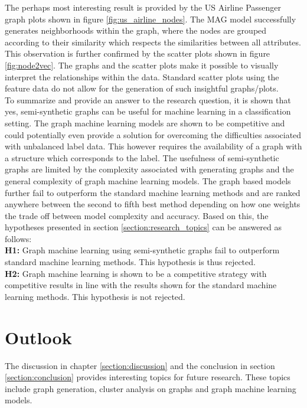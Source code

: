   \noindent The perhaps most interesting result is provided by the US Airline
  Passenger graph plots shown in figure \ref{fig:us_airline_nodes}. The MAG 
  model successfully generates neighborhoods within the graph, where the nodes 
  are grouped according to their similarity which respects the similarities 
  between all attributes. This observation is further confirmed by the scatter 
  plots shown in figure \ref{fig:node2vec}. The graphs and the scatter plots
  make it possible to visually interpret the relationships within the data. 
  Standard scatter plots using the feature data do not allow for the generation 
  of such insightful graphs/plots. \\

  \noindent To summarize and provide an answer to the research question, it is
  shown that yes, semi-synthetic graphs can be useful for machine learning in a
  classification setting. The graph machine learning models are shown to be 
  competitive and could potentially even provide a solution for overcoming the 
  difficulties associated with unbalanced label data. This however requires the 
  availability of a graph with a structure which corresponds to the label. The 
  usefulness of semi-synthetic graphs are limited by the complexity associated 
  with generating graphs and the general complexity of graph machine learning 
  models. The graph based models further fail to outperform the standard machine 
  learning methods and are ranked anywhere between the second to fifth best 
  method depending on how one weights the trade off between model complexity 
  and accuracy. Based on this, the hypotheses presented in section
  \ref{section:research_topics} can be answered as follows: \\

  \noindent\textbf{H1:} Graph machine learning using semi-synthetic graphs fail
  to outperform standard machine learning methods. This hypothesis is thus
  rejected. \\

  \noindent\textbf{H2:} Graph machine learning is shown to be a competitive
  strategy with competitive results in line with the results shown for the
  standard machine learning methods. This hypothesis is not rejected.

  \section{Outlook}

  The discussion in chapter \ref{section:discussion} and the conclusion in section
  \ref{section:conclusion} provides interesting topics for future research.
  These topics include graph generation, cluster analysis on graphs and graph 
  machine learning models. 

